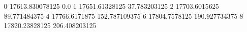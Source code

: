 0 17613.830078125 0.0
1 17651.61328125 37.783203125
2 17703.6015625 89.771484375
4 17766.6171875 152.787109375
6 17804.7578125 190.927734375
8 17820.23828125 206.408203125
